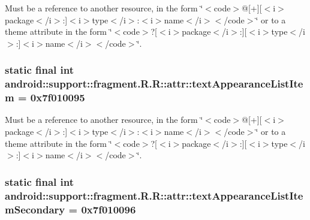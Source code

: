 Must be a reference to another resource, in the form \char`\"{}$<$code$>$@\mbox{[}+\mbox{]}\mbox{[}$<$i$>$package$<$/i$>$:\mbox{]}$<$i$>$type$<$/i$>$:$<$i$>$name$<$/i$>$$<$/code$>$\char`\"{} or to a theme attribute in the form \char`\"{}$<$code$>$?\mbox{[}$<$i$>$package$<$/i$>$:\mbox{]}\mbox{[}$<$i$>$type$<$/i$>$:\mbox{]}$<$i$>$name$<$/i$>$$<$/code$>$\char`\"{}. \hypertarget{classandroid_1_1support_1_1fragment_1_1_r_1_1attr_c0a3a203cc98ea07d40bc324a95aad31}{
\subsubsection[{textAppearanceListItem}]{\setlength{\rightskip}{0pt plus 5cm}static final int android::support::fragment.R.R::attr::textAppearanceListItem = 0x7f010095}}
\label{classandroid_1_1support_1_1fragment_1_1_r_1_1attr_c0a3a203cc98ea07d40bc324a95aad31}


Must be a reference to another resource, in the form \char`\"{}$<$code$>$@\mbox{[}+\mbox{]}\mbox{[}$<$i$>$package$<$/i$>$:\mbox{]}$<$i$>$type$<$/i$>$:$<$i$>$name$<$/i$>$$<$/code$>$\char`\"{} or to a theme attribute in the form \char`\"{}$<$code$>$?\mbox{[}$<$i$>$package$<$/i$>$:\mbox{]}\mbox{[}$<$i$>$type$<$/i$>$:\mbox{]}$<$i$>$name$<$/i$>$$<$/code$>$\char`\"{}. \hypertarget{classandroid_1_1support_1_1fragment_1_1_r_1_1attr_c4570506c50136c7ab27cbce179926fb}{
\subsubsection[{textAppearanceListItemSecondary}]{\setlength{\rightskip}{0pt plus 5cm}static final int android::support::fragment.R.R::attr::textAppearanceListItemSecondary = 0x7f010096}}
\label{classandroid_1_1support_1_1fragment_1_1_r_1_1attr_c4570506c50136c7ab27cbce179926fb}


